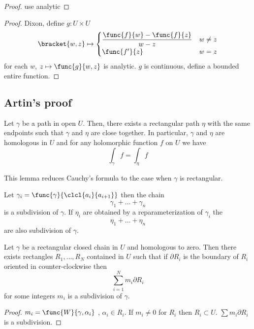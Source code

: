 \begin{proof}
    use analytic
\end{proof}

\begin{proof}
    Dixon, define \(g:  U \times U \)
    \begin{equation*}
        \bracket{w,z} \mapsto \begin{cases}
            \dfrac{\func{f}{w} - \func{f}{z}}{w- z} & w \neq z \\
            \func{f'}{z} & w= z
        \end{cases}
    \end{equation*}
    for each \(w\), \(z \mapsto \func{g}{w,z}\) is analytic. \(g\) is continuous, define a bounded entire function.
\end{proof}

\subsection{Artin's proof}
\begin{lemma}
    Let \(\gamma\) be a path in open \(U\). Then, there exists a rectangular path \(\eta\) with the same endpoints such that \(\gamma\) and \(\eta\) are close together. In particular, \(\gamma\) and \(\eta\) are homologous in \(U\) and for any holomorphic function \(f\) on \(U\) we have 
    \begin{equation*}
        \int_{\gamma} f= \int_{\eta} f
    \end{equation*}
\end{lemma}
This lemma reduces Cauchy's formula to the case when \(\gamma\) is rectangular.

\begin{definition}
    Let \(\gamma_i = \func{\gamma}{\clcl{a_i}{a_{i+1}}}\) then the chain 
    \begin{equation*}
        \gamma_1 + \dots + \gamma_n
    \end{equation*}
    is a subdivision of \(\gamma\). If \(\eta_i\) are obtained by a reparameterization of \(\gamma_i\) the
    \begin{equation*}
        \eta_1 + \dots + \eta_n
    \end{equation*}
    are also subdivision of \(\gamma\).
\end{definition}

\begin{theorem}
    Let \(\gamma\) be a rectangular closed chain in \(U\) and homologous to zero. Then there exists rectangles \(R_1 , \dots , R_N\) contained in \(U\) such that if \(\partial R_i\) is the boundary of \(R_i\) oriented in counter-clockwise then 
    \begin{equation*}
        \sum_{i = 1}^N m_i \partial R_i
    \end{equation*}
    for some integers \(m_i\) is a subdivision of \(\gamma\). 
\end{theorem}

\begin{proof}
    \(m_i = \func{W}{\gamma,\alpha_i}\) , \(\alpha_i \in R_i\). If \(m_i \neq 0\) for \(R_i\) then \(R_i \subset U\). \(\sum m_i \partial R_i\) is a subdivision.
\end{proof} 

